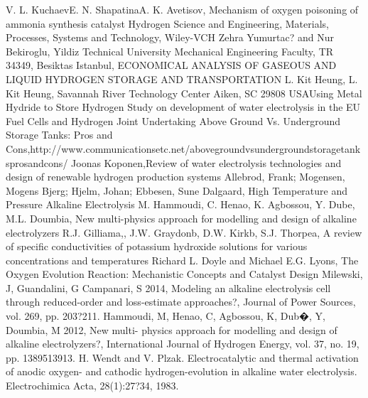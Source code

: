 \singlespacing
\begin{thebibliography}{99}
\linespread{1} 
V. L. KuchaevE. N. ShapatinaA. K. Avetisov, Mechanism of oxygen poisoning of ammonia synthesis catalyst
Hydrogen Science and Engineering, Materials, Processes, Systems and Technology, Wiley-VCH
Zehra Yumurtac? and Nur Bekiroglu, Yildiz Technical University Mechanical Engineering Faculty, TR 34349, Besiktas Istanbul, ECONOMICAL ANALYSIS OF GASEOUS AND LIQUID HYDROGEN STORAGE AND TRANSPORTATION
L. Kit Heung, L. Kit Heung, Savannah River Technology Center Aiken, SC 29808 USAUsing Metal Hydride to Store Hydrogen
Study on development of water electrolysis in the EU Fuel Cells and Hydrogen Joint Undertaking
Above Ground Vs. Underground Storage Tanks: Pros and Cons,http://www.communicationsetc.net/above\-ground\-vs\-underground\-storage\-tanks\-pros\-and\-cons/
Joonas Koponen,Review of water electrolysis technologies and design of renewable hydrogen production systems
Allebrod, Frank; Mogensen, Mogens Bjerg; Hjelm, Johan; Ebbesen, Sune Dalgaard, High Temperature and Pressure Alkaline Electrolysis
M. Hammoudi, C. Henao, K. Agbossou, Y. Dube, M.L. Doumbia, New multi-physics approach for modelling and design of alkaline electrolyzers
R.J. Gilliama,, J.W. Graydonb, D.W. Kirkb, S.J. Thorpea, A review of specific conductivities of potassium hydroxide solutions for various concentrations and temperatures
Richard L. Doyle and Michael E.G. Lyons, The Oxygen Evolution Reaction: Mechanistic Concepts and Catalyst Design
Milewski, J, Guandalini, G  Campanari, S 2014, Modeling an alkaline electrolysis cell through reduced-order and loss-estimate approaches?, Journal of Power Sources, vol. 269, pp. 203?211.
Hammoudi, M, Henao, C, Agbossou, K, Dub�, Y, Doumbia, M 2012, New multi- physics approach for modelling and design of alkaline electrolyzers?, International Journal of Hydrogen Energy, vol. 37, no. 19, pp. 1389513913.
H. Wendt and V. Plzak. Electrocatalytic and thermal activation of anodic oxygen- and cathodic hydrogen-evolution in alkaline water electrolysis. Electrochimica Acta, 28(1):27?34, 1983.

\end{thebibliography}
